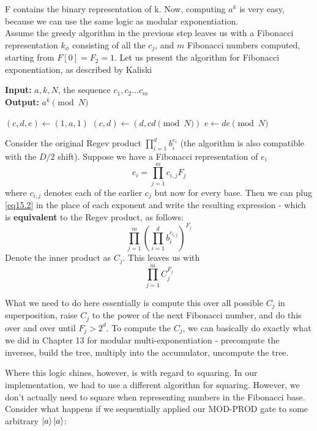 F contains the binary representation of k. Now, computing $a^k$ is very easy, because we can use the same logic as modular exponentiation.\\

Assume the greedy algorithm in the previous step leaves us with a Fibonacci representation $k_{\phi}$ consisting of all the $c_j$, and $m$ Fibonacci numbers computed, starting from $F[0] = F_2 = 1$. Let us present the algorithm for Fibonacci exponentiation, as described by Kaliski \cite{Kaliski2017}\\

\begin{algorithm}[H]
\caption{Fibonacci exponentiation}
\textbf{Input:} $a, k, N$, the sequence $c_1,c_2 \dots c_m$\\
\textbf{Output:} $a^k \pmod N$
\begin{algorithmic}[1]
\State $(c,d,e) \gets (1,a,1)$
    \State $(c,d) \gets (d,cd \pmod N)$
        \State $e \gets de \pmod N$
    \EndIf
\EndFor
\end{algorithmic}
\end{algorithm}


Consider the original Regev product $\prod_{i=1}^d b_i^{e_i}$ (the algorithm is also compatible with the $D/2$ shift). Suppose we have a Fibonacci representation of $e_i$ 
\begin{equation}
    e_i = \prod_{j=1}^m c_{i,j} F_j
    \label{eq15.2}
\end{equation}
where $c_{i,j}$ denotes each of the earlier $c_j$ but now for every base. Then we can plug \eqref{eq15.2} in the place of each exponent and write the resulting expression - which is \textbf{equivalent} to the Regev product, as follows: $$\prod_{j=1}^m(\prod_{i=1}^d b_i^{c_{i,j}})^ {F_j}$$
Denote the inner product as $C_j$. This leaves us with
\begin{equation}
    \prod_{j=1}^m C_j^ {F_j}
\end{equation}

What we need to do here essentially is compute this over all possible $C_j$ in superposition,  raise $C_j$ to the power of the next Fibonacci number, and do this over and over until $F_j > 2^d$. To compute the $C_j$, we can basically do exactly what we did in Chapter 13 for modular multi-exponentiation - precompute the inverses, build the tree, multiply into the accumulator, uncompute the tree. 

Where this logic shines, however, is with regard to squaring. In our implementation, we had to use a different algorithm for squaring. However, we don't actually need to square when representing numbers in the Fibonacci base. Consider what happens if we sequentially applied our MOD-PROD gate to some arbitrary  $\ket{a} \ket{a}$: \\

